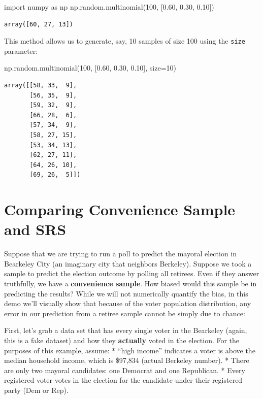 \documentclass[
  letterpaper,
  DIV=11,
  numbers=noendperiod]{scrreprt}
\newenvironment{Shaded}{\begin{snugshade}}{\end{snugshade}}
\newcommand{\DecValTok}[1]{\textcolor[rgb]{0.68,0.00,0.00}{#1}}
\newcommand{\FloatTok}[1]{\textcolor[rgb]{0.68,0.00,0.00}{#1}}
\newcommand{\ImportTok}[1]{\textcolor[rgb]{0.00,0.46,0.62}{#1}}
\newcommand{\NormalTok}[1]{\textcolor[rgb]{0.00,0.23,0.31}{#1}}
\newcommand{\OperatorTok}[1]{\textcolor[rgb]{0.37,0.37,0.37}{#1}}
\begin{document}
\begin{Shaded}
\begin{Highlighting}[]
\ImportTok{import}\NormalTok{ numpy }\ImportTok{as}\NormalTok{ np}
\NormalTok{np.random.multinomial(}\DecValTok{100}\NormalTok{, [}\FloatTok{0.60}\NormalTok{, }\FloatTok{0.30}\NormalTok{, }\FloatTok{0.10}\NormalTok{])}
\end{Highlighting}
\end{Shaded}

\begin{verbatim}
array([60, 27, 13])
\end{verbatim}

This method allows us to generate, say, 10 samples of size 100 using the
\texttt{size} parameter:

\begin{Shaded}
\begin{Highlighting}[]
\NormalTok{np.random.multinomial(}\DecValTok{100}\NormalTok{, [}\FloatTok{0.60}\NormalTok{, }\FloatTok{0.30}\NormalTok{, }\FloatTok{0.10}\NormalTok{], size}\OperatorTok{=}\DecValTok{10}\NormalTok{)}
\end{Highlighting}
\end{Shaded}

\begin{verbatim}
array([[58, 33,  9],
       [56, 35,  9],
       [59, 32,  9],
       [66, 28,  6],
       [57, 34,  9],
       [58, 27, 15],
       [53, 34, 13],
       [62, 27, 11],
       [64, 26, 10],
       [69, 26,  5]])
\end{verbatim}

\hypertarget{comparing-convenience-sample-and-srs}{%
\section{Comparing Convenience Sample and
SRS}\label{comparing-convenience-sample-and-srs}}

Suppose that we are trying to run a poll to predict the mayoral election
in Bearkeley City (an imaginary city that neighbors Berkeley). Suppose
we took a sample to predict the election outcome by polling all
retirees. Even if they answer truthfully, we have a \textbf{convenience
sample}. How biased would this sample be in predicting the results?
While we will not numerically quantify the bias, in this demo we'll
visually show that because of the voter population distribution, any
error in our prediction from a retiree sample cannot be simply due to
chance:

First, let's grab a data set that has every single voter in the
Bearkeley (again, this is a fake dataset) and how they \textbf{actually}
voted in the election. For the purposes of this example, assume: *
``high income'' indicates a voter is above the median household income,
which is \$97,834 (actual Berkeley number). * There are only two mayoral
candidates: one Democrat and one Republican. * Every registered voter
votes in the election for the candidate under their registered party
(Dem or Rep).
\end{document}
